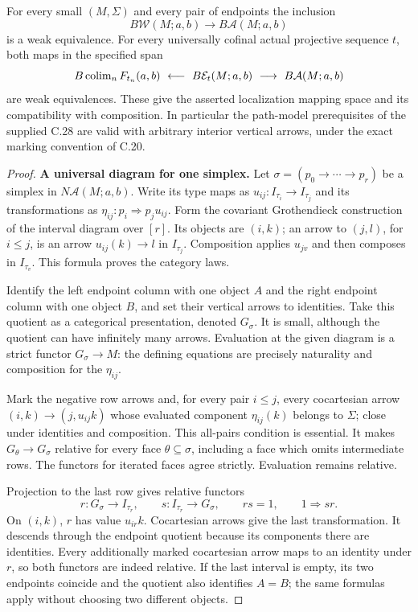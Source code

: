 \begin{theorem}
\label{F:unmarked-path-comparison}
For every small $(M,\Sigma)$ and every pair of endpoints the inclusion
\[
 B\mathcal W(M;a,b)\longrightarrow B\mathcal A(M;a,b)
\]
is a weak equivalence. For every universally cofinal actual projective
sequence $t$, both maps in the specified span
\[
 B\operatorname{colim}_n F_{t_n}(a,b)\ \longleftarrow\
 B\mathcal E_t(M;a,b)\ \longrightarrow\
 B\mathcal A(M;a,b)
\]
are weak equivalences. These give the asserted localization mapping
space and its compatibility with composition. In particular the
path-model prerequisites of the supplied C.28 are valid with arbitrary
interior vertical arrows, under the exact marking convention of C.20.
\end{theorem}
\begin{proof}
\textbf{A universal diagram for one simplex.}
Let $\sigma=(p_0\to\cdots\to p_r)$ be a simplex in
$N\mathcal A(M;a,b)$. Write its type maps as $u_{ij}:I_{\tau_i}\to
I_{\tau_j}$ and its transformations as $\eta_{ij}:p_i\Rightarrow
p_ju_{ij}$. Form the covariant Grothendieck construction of the
interval diagram over $[r]$. Its objects are $(i,k)$; an arrow to
$(j,l)$, for $i\leq j$, is an arrow $u_{ij}(k)\to l$ in
$I_{\tau_j}$. Composition applies $u_{jv}$ and then composes in
$I_{\tau_v}$. This formula proves the category laws.

Identify the left endpoint column with one object $A$ and the right
endpoint column with one object $B$, and set their vertical arrows to
identities. Take this quotient as a categorical presentation, denoted
$G_\sigma$. It is small, although the quotient can have infinitely
many arrows. Evaluation at the given diagram is a strict functor
$G_\sigma\to M$: the defining equations are precisely naturality
and composition for the $\eta_{ij}$.

Mark the negative row arrows and, for every pair $i\leq j$, every
cocartesian arrow $(i,k)\to(j,u_{ij}k)$ whose evaluated component
$\eta_{ij}(k)$ belongs to $\Sigma$; close under identities and
composition. This all-pairs condition is essential. It makes
$G_\theta\to G_\sigma$ relative for every face $\theta\subseteq
\sigma$, including a face which omits intermediate rows. The functors
for iterated faces agree strictly. Evaluation remains relative.

Projection to the last row gives relative functors
\[
 r:G_\sigma\longrightarrow I_{\tau_r},\qquad
 s:I_{\tau_r}\longrightarrow G_\sigma,
 \qquad rs=1,\qquad 1\Rightarrow sr.
\]
On $(i,k)$, $r$ has value $u_{ir}k$. Cocartesian arrows give the last
transformation. It descends through the endpoint quotient because
its components there are identities. Every additionally marked
cocartesian arrow maps to an identity under $r$, so both functors
are indeed relative. If the last interval is empty, its two endpoints
coincide and the quotient also identifies $A=B$; the same formulas
apply without choosing two different objects.


\end{proof}
